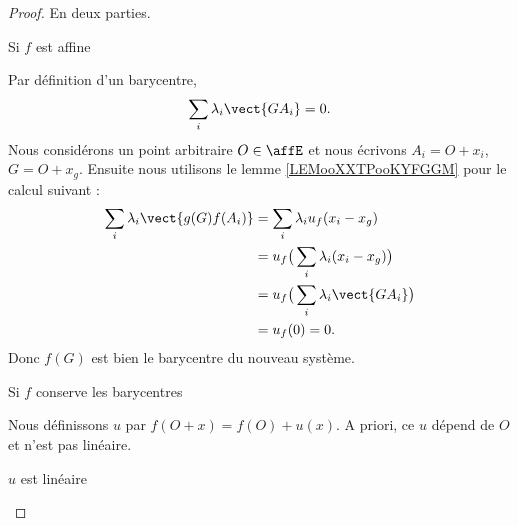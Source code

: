 \begin{proof}
    En deux parties.
    \begin{subproof}
        \item[Si \( f\) est affine]
            
            Par définition d'un barycentre, 
            \begin{equation}
                \sum_i\lambda_i\vect{ GA_i }=0.
            \end{equation}
            Nous considérons un point arbitraire \( O\in\affE\) et nous écrivons \( A_i=O+x_i\), \( G=O+x_g\). Ensuite nous utilisons le lemme \ref{LEMooXXTPooKYFGGM} pour le calcul suivant :
            \begin{subequations}
                \begin{align}
                    \sum_i\lambda_i\vect{ g(G)f(A_i) }&=\sum_i\lambda_iu_f(x_i-x_g)\\
                    &=u_f\big( \sum_i\lambda_i(x_i-x_g) \big)\\
                    &=u_f\big( \sum_i\lambda_i\vect{ GA_i } \big)\\
                    &=u_f(0)=0.
                \end{align}
            \end{subequations}
            Donc \( f(G)\) est bien le barycentre du nouveau système.

        \item[Si \( f\) conserve les barycentres]
            
            Nous définissons \( u\) par \( f(O+x)=f(O)+u(x)\). A priori, ce \( u\) dépend de \( O\) et n'est pas linéaire.
            \begin{subproof}
            \item[\( u\) est linéaire]
                

\end{subproof}
\end{subproof}
\end{proof}
